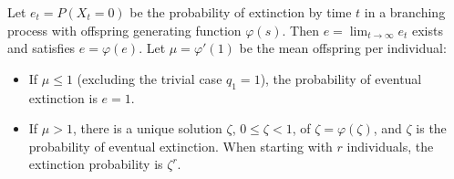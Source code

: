 Let $e_t = P(X_t = 0)$ be the probability of extinction by time $t$ in a branching process with offspring generating function $\varphi(s)$. Then $e = \lim_{t \to \infty} e_t$ exists and satisfies $e = \varphi(e)$. Let $\mu = \varphi'(1)$ be the mean offspring per individual:

\begin{itemize}
\item If $\mu \leq 1$ (excluding the trivial case $q_1 = 1$), the probability of eventual extinction is $e = 1$.
\item If $\mu > 1$, there is a unique solution $\zeta$, $0 \leq \zeta < 1$, of $\zeta = \varphi(\zeta)$, and $\zeta$ is the probability of eventual extinction. When starting with $r$ individuals, the extinction probability is $\zeta^r$.
\end{itemize}
